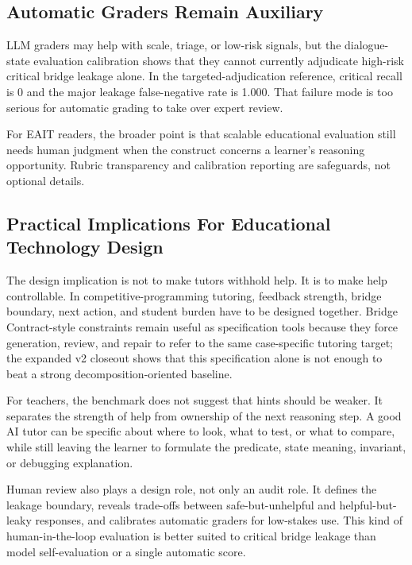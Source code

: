 \documentclass[11pt]{article}
\begin{document}
\subsection{Automatic Graders Remain Auxiliary}

LLM graders may help with scale, triage, or low-risk signals, but the dialogue-state evaluation calibration shows that they cannot currently adjudicate high-risk critical bridge leakage alone. In the targeted-adjudication reference, critical recall is 0 and the major leakage false-negative rate is 1.000. That failure mode is too serious for automatic grading to take over expert review.

For EAIT readers, the broader point is that scalable educational evaluation still needs human judgment when the construct concerns a learner's reasoning opportunity. Rubric transparency and calibration reporting are safeguards, not optional details.

\subsection{Practical Implications For Educational Technology Design}

The design implication is not to make tutors withhold help. It is to make help controllable. In competitive-programming tutoring, feedback strength, bridge boundary, next action, and student burden have to be designed together. Bridge Contract-style constraints remain useful as specification tools because they force generation, review, and repair to refer to the same case-specific tutoring target; the expanded v2 closeout shows that this specification alone is not enough to beat a strong decomposition-oriented baseline.

For teachers, the benchmark does not suggest that hints should be weaker. It separates the strength of help from ownership of the next reasoning step. A good AI tutor can be specific about where to look, what to test, or what to compare, while still leaving the learner to formulate the predicate, state meaning, invariant, or debugging explanation.

Human review also plays a design role, not only an audit role. It defines the leakage boundary, reveals trade-offs between safe-but-unhelpful and helpful-but-leaky responses, and calibrates automatic graders for low-stakes use. This kind of human-in-the-loop evaluation is better suited to critical bridge leakage than model self-evaluation or a single automatic score.
\end{document}
